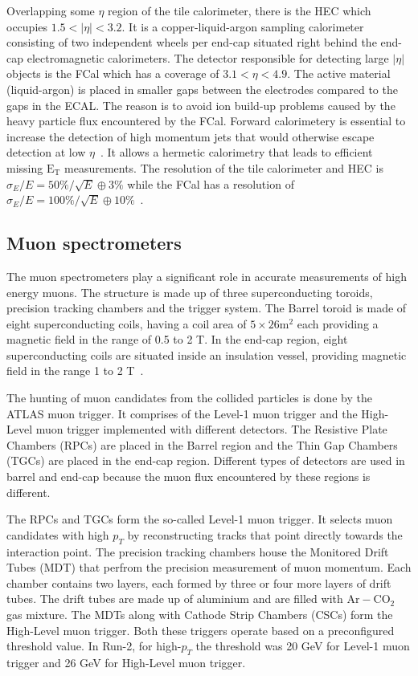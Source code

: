 Overlapping some $\eta$ region of the tile calorimeter, there is the HEC which occupies
$1.5 < |\eta| < 3.2$. It is a copper-liquid-argon sampling calorimeter consisting of two independent wheels per end-cap situated right behind the end-cap electromagnetic
calorimeters. The detector responsible for detecting large $|\eta|$ objects is the FCal which has a coverage of $3.1 < \eta < 4.9$. The active material (liquid-argon) is 
placed in smaller gaps between the electrodes compared to the gaps in the ECAL. The reason is to avoid ion build-up problems caused by the heavy particle flux 
encountered by the FCal. Forward calorimetery is essential to increase the detection of high momentum jets that would otherwise escape detection at low 
$\eta$~\cite{J-P-Archambault_2008}. It allows a hermetic calorimetry that leads to efficient missing $\text{E}_\text{T}$ measurements. The resolution of the tile 
calorimeter and HEC is $\sigma_E/E = 50\%/\sqrt{E} \oplus 3\%$ while the FCal has a resolution of $\sigma_E/E = 100\%/\sqrt{E} \oplus 10\%$~\cite{A-Artamonov_2008}.
 


\subsection{Muon spectrometers}
The muon spectrometers play a significant role in accurate measurements of high energy muons. The structure is made up of three superconducting toroids, 
precision tracking chambers and the trigger system. The Barrel toroid is made of eight superconducting coils, having a coil area of $5 \times 26 \text{m}^2$ each 
providing a magnetic field in the range of 0.5 to 2 T. In the end-cap region, eight superconducting coils are situated inside an insulation vessel, providing magnetic 
field in the range 1 to 2 T~\cite{Palestini:2003noa}. 

The hunting of muon candidates from the collided particles is done by the ATLAS muon trigger. It comprises of the Level-1 muon trigger and the High-Level muon trigger implemented with 
different detectors. The Resistive Plate Chambers (RPCs) are placed in the Barrel region and the Thin Gap Chambers (TGCs) are placed in the end-cap region. Different types of 
detectors are used in barrel and end-cap because the muon flux encountered by these regions is different. 

The RPCs and TGCs form the so-called Level-1 muon trigger. It selects muon
candidates with high $p_T$ by reconstructing tracks that point directly towards the interaction point. The precision tracking 
chambers house the Monitored Drift Tubes (MDT) that perfrom the precision measurement of muon momentum. Each chamber
contains two layers, each formed by three or four more layers of drift tubes. The drift tubes are made up of aluminium and are filled with $\text{Ar}-\text{CO}_2$ gas mixture.
The MDTs along with Cathode Strip Chambers (CSCs) form the High-Level muon trigger. Both these triggers operate based on a preconfigured threshold value. In Run-2, for high-$p_T$ the 
threshold was 20 GeV for Level-1 muon trigger and 26 GeV for High-Level muon trigger.  

